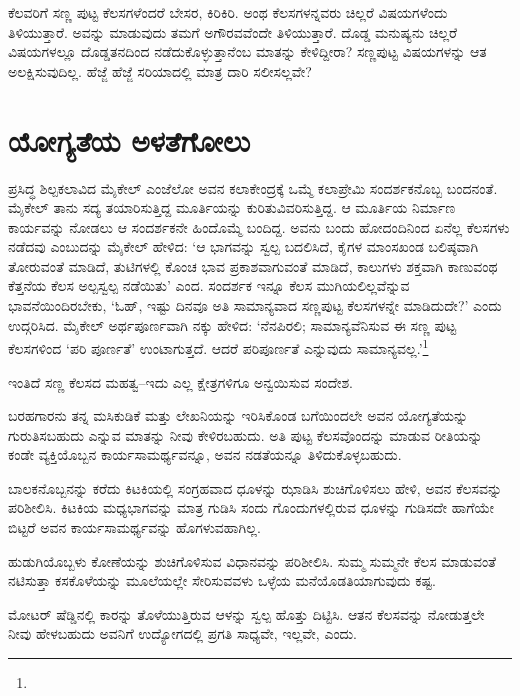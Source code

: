 ಕೆಲವರಿಗೆ ಸಣ್ಣ ಪುಟ್ಟ ಕೆಲಸಗಳೆಂದರೆ ಬೇಸರ, ಕಿರಿಕಿರಿ. ಅಂಥ ಕೆಲಸಗಳನ್ನವರು ಚಿಲ್ಲರೆ ವಿಷಯಗಳೆಂದು ತಿಳಿಯುತ್ತಾರೆ. ಅವನ್ನು ಮಾಡುವುದು ತಮಗೆ ಅಗೌರವವೆಂದೇ ತಿಳಿಯುತ್ತಾರೆ. ದೊಡ್ಡ ಮನುಷ್ಯನು ಚಿಲ್ಲರೆ ವಿಷಯಗಳಲ್ಲೂ ದೊಡ್ಡತನದಿಂದ ನಡೆದುಕೊಳ್ಳುತ್ತಾನೆಂಬ ಮಾತನ್ನು ಕೇಳಿದ್ದೀರಾ? ಸಣ್ಣಪುಟ್ಟ ವಿಷಯಗಳನ್ನು ಆತ ಅಲಕ್ಷಿಸುವುದಿಲ್ಲ. ಹೆಜ್ಜೆ ಹೆಜ್ಜೆ ಸರಿಯಾದಲ್ಲಿ ಮಾತ್ರ ದಾರಿ ಸಲೀಸಲ್ಲವೇ?


\section*{ಯೋಗ್ಯತೆಯ ಅಳತೆಗೋಲು}


ಪ್ರಸಿದ್ಧ ಶಿಲ್ಪಕಲಾವಿದ ಮೈಕೇಲ್ ಎಂಜೆಲೋ ಅವನ ಕಲಾಕೇಂದ್ರಕ್ಕೆ ಒಮ್ಮೆ ಕಲಾಪ್ರೇಮಿ ಸಂದರ್ಶಕ\-ನೊಬ್ಬ ಬಂದನಂತೆ. ಮೈಕೇಲ್ ತಾನು ಸದ್ಯ ತಯಾರಿಸುತ್ತಿದ್ದ ಮೂರ್ತಿಯನ್ನು ಕುರಿತು\break ವಿವರಿಸುತ್ತಿದ್ದ. ಆ ಮೂರ್ತಿಯ ನಿರ್ಮಾಣ ಕಾರ್ಯವನ್ನು ನೋಡಲು ಆ ಸಂದರ್ಶಕನೇ ಹಿಂದೊಮ್ಮೆ ಬಂದಿದ್ದ. ಅವನು ಬಂದು ಹೋದಂದಿನಿಂದ ಏನೆಲ್ಲ ಕೆಲಸಗಳು ನಡೆದವು ಎಂಬುದನ್ನು ಮೈಕೇಲ್ ಹೇಳಿದ: ‘ಆ ಭಾಗವನ್ನು ಸ್ವಲ್ಪ ಬದಲಿಸಿದೆ, ಕೈಗಳ ಮಾಂಸಖಂಡ ಬಲಿಷ್ಠವಾಗಿ ತೋರುವಂತೆ ಮಾಡಿದೆ, ತುಟಿಗಳಲ್ಲಿ ಕೊಂಚ ಭಾವ ಪ್ರಕಾಶವಾಗುವಂತೆ ಮಾಡಿದೆ, ಕಾಲುಗಳು ಶಕ್ತವಾಗಿ ಕಾಣುವಂಥ ಕೆತ್ತನೆಯ ಕೆಲಸ ಅಲ್ಪಸ್ವಲ್ಪ ನಡೆಯಿತು’ ಎಂದ. ಸಂದರ್ಶಕ ಇನ್ನೂ ಕೆಲಸ ಮುಗಿಯಲಿಲ್ಲವೆನ್ನುವ ಭಾವನೆಯಿಂದಿರಬೇಕು, ‘ಓಹ್, ಇಷ್ಟು ದಿನವೂ ಅತಿ ಸಾಮಾನ್ಯವಾದ ಸಣ್ಣಪುಟ್ಟ ಕೆಲಸಗಳನ್ನೇ ಮಾಡಿದುದೇ?’ ಎಂದು ಉದ್ಗರಿಸಿದ. ಮೈಕೇಲ್ ಅರ್ಥಪೂರ್ಣವಾಗಿ ನಕ್ಕು ಹೇಳಿದ: ‘ನೆನಪಿರಲಿ; ಸಾಮಾನ್ಯವೆನಿಸುವ ಈ ಸಣ್ಣ ಪುಟ್ಟ ಕೆಲಸಗಳಿಂದ ‘ಪರಿ ಪೂರ್ಣತೆ’ ಉಂಟಾಗುತ್ತದೆ. ಆದರೆ ಪರಿಪೂರ್ಣತೆ ಎನ್ನುವುದು ಸಾಮಾನ್ಯವಲ್ಲ.’\footnote{\hfill{}}

ಇಂತಿದೆ ಸಣ್ಣ ಕೆಲಸದ ಮಹತ್ವ–ಇದು ಎಲ್ಲ ಕ್ಷೇತ್ರಗಳಿಗೂ ಅನ್ವಯಿಸುವ ಸಂದೇಶ.

ಬರಹಗಾರನು ತನ್ನ ಮಸಿಕುಡಿಕೆ ಮತ್ತು ಲೇಖನಿಯನ್ನು ಇರಿಸಿಕೊಂಡ ಬಗೆಯಿಂದಲೇ ಅವನ ಯೋಗ್ಯತೆಯನ್ನು ಗುರುತಿಸಬಹುದು ಎನ್ನುವ ಮಾತನ್ನು ನೀವು ಕೇಳಿರಬಹುದು. ಅತಿ ಪುಟ್ಟ ಕೆಲಸವೊಂದನ್ನು ಮಾಡುವ ರೀತಿಯನ್ನು ಕಂಡೇ ವ್ಯಕ್ತಿಯೊಬ್ಬನ ಕಾರ್ಯಸಾಮರ್ಥ್ಯವನ್ನೂ, ಅವನ ನಡತೆಯನ್ನೂ ತಿಳಿದುಕೊಳ್ಳಬಹುದು.

ಬಾಲಕನೊಬ್ಬನನ್ನು ಕರೆದು ಕಿಟಕಿಯಲ್ಲಿ ಸಂಗ್ರಹವಾದ ಧೂಳನ್ನು ಝಾಡಿಸಿ ಶುಚಿಗೊಳಿಸಲು ಹೇಳಿ, ಅವನ ಕೆಲಸವನ್ನು ಪರಿಶೀಲಿಸಿ. ಕಿಟಕಿಯ ಮಧ್ಯಭಾಗವನ್ನು ಮಾತ್ರ ಗುಡಿಸಿ ಸಂದು ಗೊಂದುಗಳಲ್ಲಿರುವ ಧೂಳನ್ನು ಗುಡಿಸದೇ ಹಾಗೆಯೇ ಬಿಟ್ಟರೆ ಅವನ ಕಾರ್ಯಸಾಮರ್ಥ್ಯವನ್ನು ಹೊಗಳುವಹಾಗಿಲ್ಲ.

ಹುಡುಗಿಯೊಬ್ಬಳು ಕೋಣೆಯನ್ನು ಶುಚಿಗೊಳಿಸುವ ವಿಧಾನವನ್ನು ಪರಿಶೀಲಿಸಿ. ಸುಮ್ಮ ಸುಮ್ಮನೇ ಕೆಲಸ ಮಾಡುವಂತೆ ನಟಿಸುತ್ತಾ ಕಸಕೊಳೆಯನ್ನು ಮೂಲೆಯಲ್ಲೇ ಸೇರಿಸುವವಳು ಒಳ್ಳೆಯ ಮನೆಯೊಡತಿಯಾಗುವುದು ಕಷ್ಟ.

ಮೋಟರ್ ಷೆಡ್ಡಿನಲ್ಲಿ ಕಾರನ್ನು ತೊಳೆಯುತ್ತಿರುವ ಆಳನ್ನು ಸ್ವಲ್ಪ ಹೊತ್ತು ದಿಟ್ಟಿಸಿ. ಆತನ ಕೆಲಸವನ್ನು ನೋಡುತ್ತಲೇ ನೀವು ಹೇಳಬಹುದು ಅವನಿಗೆ ಉದ್ಯೋಗದಲ್ಲಿ ಪ್ರಗತಿ ಸಾಧ್ಯವೇ, ಇಲ್ಲವೇ, ಎಂದು.

